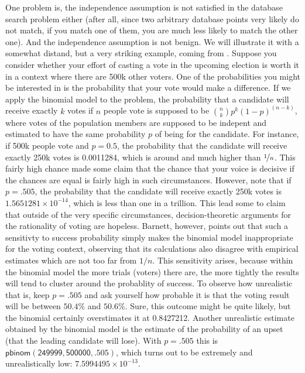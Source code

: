 \documentclass[10pt,dvipsnames,enabledeprecatedfontcommands]{scrartcl}
\begin{document}
One problem is, the independence assumption is not satisfied in the
database search problem either (after all, since two arbitrary database
points very likely do not match, if you match one of them, you are much
less likely to match the other one). And the independence assumption is
not benign. We will illustrate it with a somewhat distand, but a very
striking example, coming from . Suppose you consider
whether your effort of casting a vote in the upcoming election is worth
it in a context where there are 500k other voters. One of the
probabilities you might be interested in is the probability that your
vote would make a difference. If we apply the binomial model to the
problem, the probability that a candidate will receive exactly \(k\)
votes if \(n\) people vote is supposed to be
\({n \choose k} p^{k} (1-p)^{(n-k)}\), where votes of the population
members are supposed to be indepent and estimated to have the same
probability \(p\) of being for the candidate. For instance, if 500k
people vote and \(p= 0.5\), the probability that the candidate will
receive exactly 250k votes is 0.0011284, which is around
 and much higher than \(\nicefrac{1}{n}\). This fairly
high chance made some claim that the chance that your voice is decisive
if the chances are equal is fairly high in such circumstances. However,
note that if \(p=.505\), the probability that the candidate will receive
exactly 250k votes is \ensuremath{1.5651281\times 10^{-14}}, which is
less than one in a trillion. This lead some
 to claim that
outside of the very specific circumstances, decision-theoretic arguments
for the rationality of voting are hopeless. Barnett, 
however, points out that such a sensitivty to success probability simply
makes the binomial model inappropriate for the voting context, observing
that its calculations also disagree with empirical estimates which are
not too far from \(1/n\).
 This sensitivity arises, because within the binomial model the
more trials (voters) there are, the more tightly the results will tend
to cluster around the probablity of success. To observe how unrealistic
that is, keep \(p=.505\) and ask yourself how probable it is that the
voting result will be between \(50.4\%\) and \(50.6\%\). Sure, this
outcome might be quite likely, but the binomial certainly overstimates
it at 0.8427212. Another unrealistic estimate obtained by the binomial
model is the estimate of the probability of an upset (that the leading
candidate will lose). With \(p=.505\) this is
\(\mathsf{pbinom(249999,500000,.505)}\), which turns out to be extremely
and unrealistically low: \ensuremath{7.5994495\times 10^{-13}}.
\end{document}
